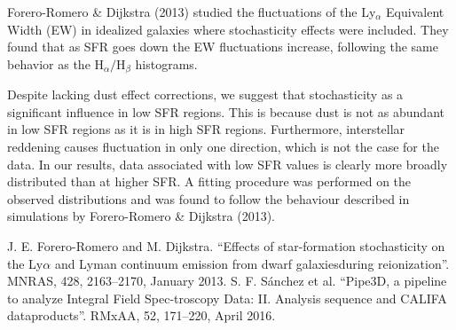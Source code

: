 \documentclass[preprint,proceedings]{rmaa}
\begin{document}
Forero-Romero \& Dijkstra (2013) studied the fluctuations of the Ly$_{\alpha}$
Equivalent Width (EW) in idealized galaxies where stochasticity
effects were included. They found that as SFR goes down the EW
fluctuations increase, following the same behavior as the
H$_{\alpha}/$H$_{\beta}$ histograms.

Despite lacking dust effect corrections, we suggest that 
stochasticity as a significant influence in low SFR regions. This is
because dust is not as abundant in low SFR regions as it is in high
SFR regions. Furthermore, interstellar reddening causes fluctuation in
only one direction, which is not the case for the data. In our
results, data associated with low SFR values is clearly more broadly
distributed than at higher SFR. A fitting procedure was performed on
the observed distributions and was found to follow the behaviour
described in simulations by Forero-Romero \& Dijkstra (2013).  \\
 
\begin{thebibliography}

 J. E. Forero-Romero and M. Dijkstra. “Effects of star-formation stochasticity on the Ly$\alpha$ and Lyman continuum emission from dwarf galaxiesduring  reionization”.  MNRAS, 428, 2163–2170, January 2013.
 S. F. S\'anchez et al. “Pipe3D, a pipeline to analyze Integral Field Spec-troscopy Data: II. Analysis sequence and CALIFA dataproducts”. RMxAA, 52, 171–220, April 2016.

  
\end{thebibliography}
\end{document}

